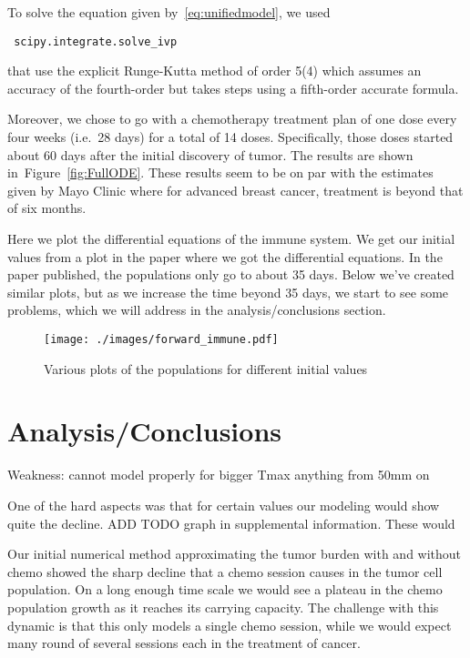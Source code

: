 \documentclass[11pt]{amsart}
\begin{document}
To solve the equation given by\ \eqref{eq:unifiedmodel}, we used \begin{verbatim} scipy.integrate.solve_ivp \end{verbatim}
that use the explicit Runge-Kutta method of order 5(4) which assumes an accuracy of the fourth-order but takes steps using a fifth-order accurate formula.

Moreover, we chose to go with a chemotherapy treatment plan of one dose every four weeks (i.e.\ 28 days) for a total of 14 doses.
Specifically, those doses started about 60 days after the initial discovery of tumor.
The results are shown in\ Figure~\ref{fig:FullODE}.
These results seem to be on par with the estimates given by Mayo Clinic where for advanced breast cancer, treatment is beyond that of six months.

Here we plot the differential equations of the immune system. 
We get our initial values from a plot in the paper where we got the differential equations. 
In the paper published, the populations only go to about 35 days. 
Below we've created similar plots, but as we increase the time beyond 35 days, 
we start to see some problems, which we will address in the analysis/conclusions section.

\begin{figure}[h!]
\begin{center} %
\texttt{[image: ./images/forward\_immune.pdf]} %
\end{center}
\caption{Various plots of the populations for different initial values}
\label{fig:forward} %
\end{figure}





\section{Analysis/Conclusions}

Weakness: cannot model properly for bigger Tmax anything from 50mm on

One of the hard aspects was that for certain values our modeling would show quite the decline.
ADD TODO graph in supplemental information.
These would 

Our initial numerical method approximating the tumor burden with and without chemo showed the sharp decline that a chemo session causes in the tumor cell population. 
On a long enough time scale we would see a plateau in the chemo population growth as it reaches its carrying capacity. 
The challenge with this dynamic is that this only models a single chemo session, 
while we would expect many round of several sessions each in the treatment of cancer.
\end{document}
